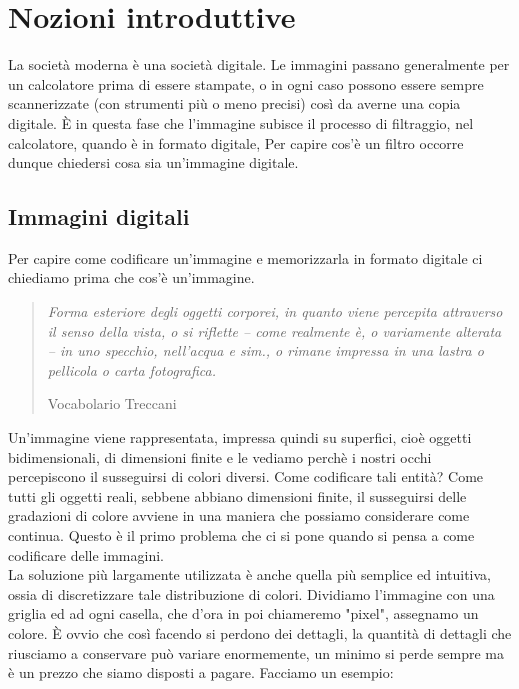 \chapter{Nozioni introduttive}
La società moderna è una società digitale. Le immagini passano generalmente per un calcolatore prima di essere stampate, o in ogni caso possono essere sempre scannerizzate (con strumenti più o meno precisi) così da averne una copia digitale.
\`E in questa fase che l'immagine subisce il processo di filtraggio, nel calcolatore, quando è in formato digitale, Per capire cos'è un filtro occorre dunque chiedersi cosa sia un'immagine digitale.

\section{Immagini digitali}
Per capire come codificare un'immagine e memorizzarla in formato digitale ci chiediamo prima che cos'è un'immagine.

\begin{quote}
\epigraph{\textit{Forma esteriore degli oggetti corporei, in quanto viene percepita attraverso il senso della vista, o si riflette – come realmente è, o variamente alterata – in uno specchio, nell’acqua e sim., o rimane impressa in una lastra o pellicola o carta fotografica.}}{Vocabolario Treccani}
\end{quote}

    


\noindent
Un'immagine viene rappresentata, impressa quindi su superfici, cioè oggetti bidimensionali, di dimensioni finite e le vediamo perchè i nostri occhi percepiscono il susseguirsi di colori diversi. Come codificare tali entità?
Come tutti gli oggetti reali, sebbene abbiano dimensioni finite, il susseguirsi delle gradazioni di colore avviene in una maniera che possiamo considerare come continua. Questo è il primo problema che ci si pone quando si pensa a come codificare delle immagini.\\
La soluzione più largamente utilizzata è anche quella più semplice ed intuitiva, ossia di discretizzare tale distribuzione di colori. Dividiamo l'immagine con una griglia ed ad ogni casella, che d'ora in poi chiameremo "pixel", assegnamo un colore.
\`E ovvio che così facendo si perdono dei dettagli, la quantità di dettagli che riusciamo a conservare può variare enormemente, un minimo si perde sempre ma è un prezzo che siamo disposti a pagare.
\newpage
Facciamo un esempio:

